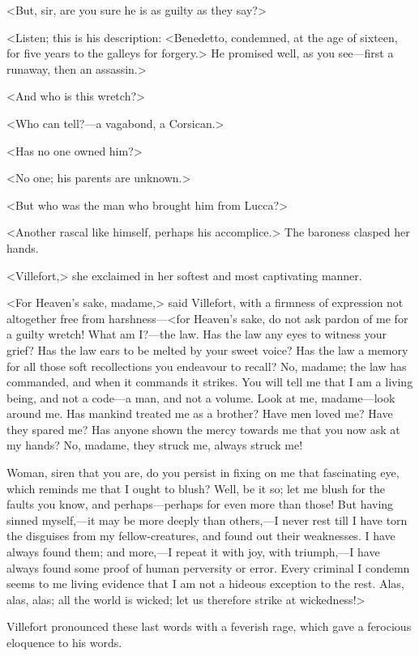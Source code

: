  <But, sir, are you sure he is as guilty as they say?> 

 <Listen; this is his description: <Benedetto, condemned, at the age of sixteen, for five years to the galleys for forgery.> He promised well, as you see—first a runaway, then an assassin.> 

 <And who is this wretch?> 

 <Who can tell?—a vagabond, a Corsican.> 

 <Has no one owned him?> 

 <No one; his parents are unknown.> 

 <But who was the man who brought him from Lucca?> 

 <Another rascal like himself, perhaps his accomplice.> The baroness clasped her hands. 

 <Villefort,> she exclaimed in her softest and most captivating manner. 

 <For Heaven's sake, madame,> said Villefort, with a firmness of expression not altogether free from harshness—<for Heaven's sake, do not ask pardon of me for a guilty wretch! What am I?—the law. Has the law any eyes to witness your grief? Has the law ears to be melted by your sweet voice? Has the law a memory for all those soft recollections you endeavour to recall? No, madame; the law has commanded, and when it commands it strikes. You will tell me that I am a living being, and not a code—a man, and not a volume. Look at me, madame—look around me. Has mankind treated me as a brother? Have men loved me? Have they spared me? Has anyone shown the mercy towards me that you now ask at my hands? No, madame, they struck me, always struck me!  
 
 Woman, siren that you are, do you persist in fixing on me that fascinating eye, which reminds me that I ought to blush? Well, be it so; let me blush for the faults you know, and perhaps—perhaps for even more than those! But having sinned myself,—it may be more deeply than others,—I never rest till I have torn the disguises from my fellow-creatures, and found out their weaknesses. I have always found them; and more,—I repeat it with joy, with triumph,—I have always found some proof of human perversity or error. Every criminal I condemn seems to me living evidence that I am not a hideous exception to the rest. Alas, alas, alas; all the world is wicked; let us therefore strike at wickedness!> 

 Villefort pronounced these last words with a feverish rage, which gave a ferocious eloquence to his words. 

